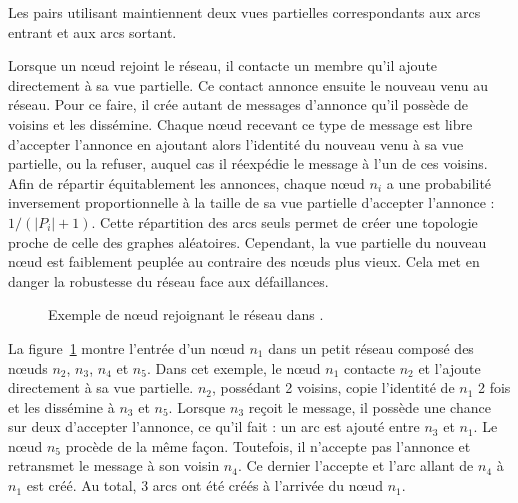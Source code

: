 \noindent Les pairs utilisant \SCAMP maintiennent deux vues partielles
correspondants aux arcs entrant et aux arcs sortant.

\noindent Lorsque un nœud rejoint le réseau, il contacte un membre qu'il ajoute
directement à sa vue partielle. Ce contact annonce ensuite le nouveau venu au
réseau. Pour ce faire, il crée autant de messages d'annonce qu'il possède de
voisins et les dissémine. Chaque nœud recevant ce type de message est libre
d'accepter l'annonce en ajoutant alors l'identité du nouveau venu à sa vue
partielle, ou la refuser, auquel cas il réexpédie le message à l'un de ces
voisins. Afin de répartir équitablement les annonces, chaque nœud $n_i$ a une
probabilité inversement proportionnelle à la taille de sa vue partielle
d'accepter l'annonce : $1/(|P_i|+1)$. Cette répartition des arcs seuls permet
de créer une topologie proche de celle des graphes aléatoires. Cependant, la vue
partielle du nouveau nœud est faiblement peuplée au contraire des nœuds plus
vieux. Cela met en danger la robustesse du réseau face aux défaillances.

\begin{figure}
  \centering
  
  \caption[Entrée dans un réseau dans \SCAMP]
  {\label{net:fig:scampexample} Exemple de nœud rejoignant le réseau dans
    \SCAMP.}
\end{figure}

\noindent La figure~\ref{net:fig:scampexample} montre l'entrée d'un nœud $n_1$
dans un petit réseau \SCAMP composé des nœuds $n_2$, $n_3$, $n_4$ et $n_5$. Dans
cet exemple, le nœud $n_1$ contacte $n_2$ et l'ajoute directement à sa vue
partielle. $n_2$, possédant 2 voisins, copie l'identité de $n_1$ 2 fois et les
dissémine à $n_3$ et $n_5$. Lorsque $n_3$ reçoit le message, il possède une
chance sur deux d'accepter l'annonce, ce qu'il fait : un arc est ajouté entre
$n_3$ et $n_1$. Le nœud $n_5$ procède de la même façon. Toutefois, il n'accepte
pas l'annonce et retransmet le message à son voisin $n_4$. Ce dernier l'accepte
et l'arc allant de $n_4$ à $n_1$ est créé. Au total, 3 arcs ont été créés à
l'arrivée du nœud $n_1$.


